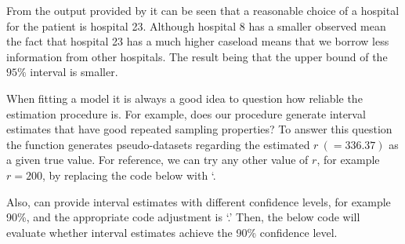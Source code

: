 \documentclass[article]{jss}
\begin{document}
From the output provided by  it can be seen that a reasonable choice of a hospital for the patient is hospital 23. Although hospital 8 has a smaller observed mean the fact that hospital 23 has a much higher caseload means that we borrow less information from other hospitals. The result being that the upper bound of the $95\%$ interval is smaller.





When fitting a model it is always a good idea to question how reliable the estimation procedure is. For example, does our procedure generate interval estimates that have good repeated sampling properties? To answer this question the  function generates pseudo-datasets regarding the estimated $r~(=336.37)$ as a given true value. For reference, we can try any other value of $r$, for example $r=200$, by replacing the code below with `.


Also,  can provide interval estimates with different confidence levels, for example 90\%,  and the appropriate code adjustment is `.'  Then, the below code will evaluate whether interval estimates achieve the 90\% confidence level.
\end{document}

